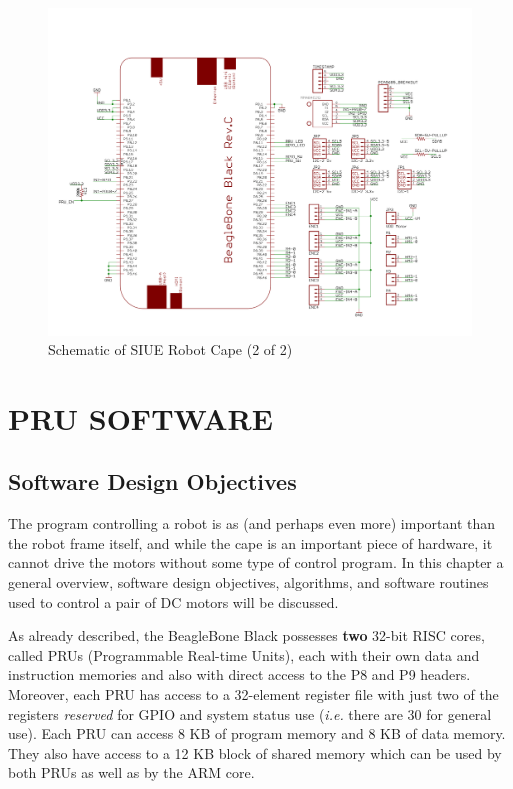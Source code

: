 \documentclass[12pt,oneside,final]{siuethesis}
\theoremstyle{definition}
\begin{document}
\begin{figure}
 \centering
 \includegraphics[scale=.25,keepaspectratio=true]{./images/schematic_2.png}
 \caption{Schematic of SIUE Robot Cape (2 of 2)}
 \label{fig:Schematic_2}
\end{figure}


\chapter{PRU SOFTWARE}

\section{Software Design Objectives}

The program controlling a robot is as (and perhaps even more) important than the robot frame itself, and while the cape is an important piece of hardware, it cannot drive the motors without some type of control program. In this chapter a general overview, software design objectives, algorithms, and software routines used to control a pair of DC motors will be discussed.

As already described, the BeagleBone Black possesses \textbf{two} 32-bit RISC cores, called PRUs (Programmable Real-time Units), each with their own data and instruction memories and also with direct access to the P8 and P9 headers. Moreover, each PRU has access to a 32-element register file with just two of the registers \emph{reserved} for GPIO and system status use (\emph{i.e.} there are 30 for general use).  Each PRU can access 8 KB of program memory and 8 KB of data memory. They also have access to a 12 KB block of shared memory which can be used by both PRUs as well as by the ARM core.
\end{document}
